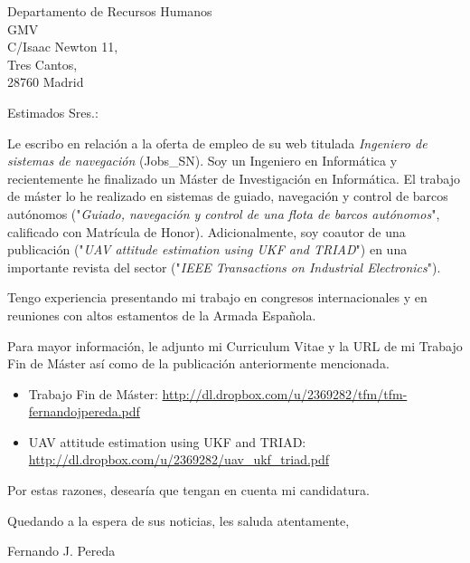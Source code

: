 \documentclass{letter}
\begin{document}
    \begin{letter}{Departamento de Recursos Humanos\\GMV\\C/Isaac Newton 11,\\Tres Cantos,\\28760 Madrid}
        \opening{Estimados Sres.:}

        Le escribo en relación a la oferta de empleo de su web titulada \emph{Ingeniero de sistemas
        de navegación} (Jobs\_SN). Soy un Ingeniero en Informática y recientemente he finalizado un
        Máster de Investigación en Informática. El trabajo de máster lo he realizado en sistemas de
        guiado, navegación y control de barcos autónomos ("\emph{Guiado, navegación y control de una
        flota de barcos autónomos}", calificado con Matrícula de Honor). Adicionalmente, soy coautor
        de una publicación ("\emph{UAV attitude estimation using UKF and TRIAD}") en una importante
        revista del sector ("\emph{IEEE Transactions on Industrial Electronics}").

        Tengo experiencia presentando mi trabajo en congresos internacionales y en reuniones con
        altos estamentos de la Armada Española.

        Para mayor información, le adjunto mi Curriculum Vitae y la URL de mi Trabajo Fin de Máster
        así como de la publicación anteriormente mencionada.

        \begin{itemize}
            \item Trabajo Fin de Máster:
                \url{http://dl.dropbox.com/u/2369282/tfm/tfm-fernandojpereda.pdf}
            \item UAV attitude estimation using UKF and TRIAD:
                \url{http://dl.dropbox.com/u/2369282/uav_ukf_triad.pdf}
        \end{itemize}

        Por estas razones, desearía que tengan en cuenta mi candidatura.

        Quedando a la espera de sus noticias, les saluda atentamente,
        \closing{Fernando J. Pereda}
    \end{letter}
\end{document}
